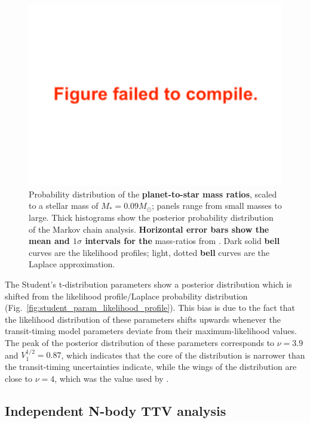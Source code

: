 \documentclass[twocolumn]{aastex63}
\begin{document}
\begin{figure}
    \centering
    \includegraphics[width=\hsize]{figures/T1_masses_03312020.pdf}
    {Probability distribution of the \textbf{planet-to-star mass ratios}, scaled to a stellar mass of $M_*  = 0.09 M_\odot$; panels range from small masses to large.   Thick
        histograms show the posterior probability distribution of the Markov chain analysis.
        \textbf{Horizontal error bars show the mean and $1\sigma$ intervals for the} mass-ratios from \citet{Grimm2018}.
        Dark solid \textbf{bell} curves are the likelihood profiles; light, dotted \textbf{bell} curves are the Laplace approximation.}
    \label{fig:mass_likelihood_profile}
\end{figure}

The Student's t-distribution parameters show a posterior distribution which is shifted from the likelihood profile/Laplace probability distribution (Fig.\ \ref{fig:student_param_likelihood_profile}).  This bias is due to the fact that the likelihood distribution of these parameters shifts upwards whenever the transit-timing model parameters deviate from their maximum-likelihood values.  The peak of  the  posterior distribution of these parameters corresponds to
$\nu = 3.9$ and $V_1^{1/2} = 0.87$, which indicates that the core of the distribution is narrower than the transit-timing uncertainties indicate, while the wings of the distribution are close to $\nu = 4$, which was the value used by
\citet{JontofHutter2016}.



\subsection{Independent N-body TTV analysis}
\end{document}
